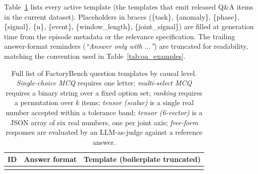 \documentclass{article}
\begin{document}
Table~\ref{tab:template_list} lists every active template (the templates that emit released Q\&A items in the current dataset). Placeholders in braces (\{task\}, \{anomaly\}, \{phase\}, \{signal\}, \{n\}, \{event\}, \{window\_length\}, \{joint\_signal\}) are filled at generation time from the episode metadata or the relevance specification. The trailing answer-format reminders (\emph{``Answer only with $\ldots$''}) are truncated for readability, matching the convention used in Table~\ref{tab:qa_examples}.

\begin{small}
    \renewcommand{\arraystretch}{1.4}
    \begin{longtable}{@{}>{\centering\arraybackslash}p{}>{\raggedright\arraybackslash}p{}>{\raggedright\arraybackslash}p{}@{}}
        \caption{Full list of FactoryBench question templates by causal level. \emph{Single-choice MCQ} requires one letter; \emph{multi-select MCQ} requires a binary string over a fixed option set; \emph{ranking} requires a permutation over $k$ items; \emph{tensor (scalar)} is a single real number accepted within a tolerance band; \emph{tensor (6-vector)} is a JSON array of six real numbers, one per joint axis; \emph{free-form} responses are evaluated by an LLM-as-judge against a reference answer.}\label{tab:template_list} \\
        \toprule
        \textbf{ID} & \textbf{Answer format} & \textbf{Template (boilerplate truncated)}                                                                                                                                                                                                                                                                                                                                                                                                                                                          \\
        \midrule
        \endfirsthead
        \multicolumn{3}{@{}l}{\footnotesize\emph{Table~\ref{tab:template_list} continued from previous page}}                                                                                                                                                                                                                                                                                                                                                                                                                                     \\

\end{longtable}
\end{small}
\end{document}
